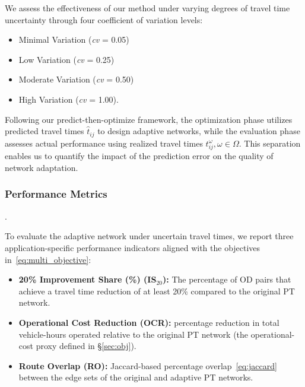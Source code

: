 \documentclass[a4paper,fleqn]{cas-sc}
\begin{document}
We assess the effectiveness of our method under varying degrees of travel time uncertainty through four coefficient of variation levels: 
\begin{itemize}
    \item Minimal Variation (\textit{cv} = 0.05)
    \item Low Variation (\textit{cv} = 0.25)
    \item Moderate Variation (\textit{cv} = 0.50)
    \item High Variation (\textit{cv} = 1.00).
\end{itemize}
%
Following our predict-then-optimize framework, the optimization phase utilizes predicted travel times $\hat{t}_{ij}$ to design adaptive networks, while the evaluation phase assesses actual performance using realized travel times $t_{ij}^\omega,\omega\in\Omega$. This separation enables us to quantify the impact of the prediction error on the quality of network adaptation.

\subsubsection{Performance Metrics}\label{sec:performMETRICS}.

To evaluate the adaptive network under uncertain travel times, we report three
application-specific performance indicators aligned with the objectives
in~\eqref{eq:multi_objective}:

\begin{itemize}
    \item \textbf{20\% Improvement Share (\%) (IS$_{20}$):} The percentage of OD pairs that achieve a travel time reduction of at least 20\% compared to the original PT network.
    \item \textbf{Operational Cost Reduction (OCR):} percentage reduction in
    total vehicle-hours operated relative to the original PT network (the operational-cost proxy defined in \S\ref{sec:obj}).
    \item \textbf{Route Overlap (RO):} Jaccard-based percentage overlap~\eqref{eq:jaccard} between the edge sets of the original and adaptive PT networks.
\end{itemize}
\end{document}
